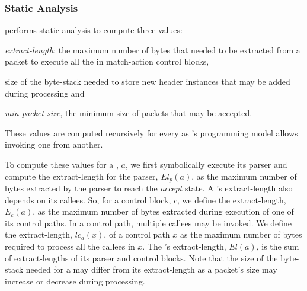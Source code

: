 \documentclass[letterpaper,twocolumn,10pt]{article}
\begin{document}
\subsubsection{Static Analysis}
\label{subsubsection:static-analysis}
\ucomp performs static analysis to compute three values:
\begin{enumerate*}[label=(\roman*)]
  \item \emph{extract-length}: the maximum number of bytes that needed
    to be extracted from a packet to execute all the \uprograms in
    match-action control blocks,
  \item size of the byte-stack needed to store new header instances
    that may be added during processing and
  \item \emph{min-packet-size}, the minimum size of packets that may
    be accepted.
\end{enumerate*}
These values are computed recursively for every \uprogram as
\uswitch's programming model allows invoking one \uprogram from
another.

To compute these values for a \uprogram, $a$, we first symbolically
execute its parser and compute the extract-length for the parser,
$El_{p}(a)$, as the maximum number of bytes extracted by the parser to
reach the \textit{accept} state. A \uprogram's extract-length also
depends on its callees. So, for a control block, $c$, we define the
extract-length, $E_{c}(a)$, as the maximum number of bytes extracted
during execution of one of its control paths. In a control path,
multiple callees may be invoked. We define the extract-length,
$lc_{a}(x)$, of a control path $x$ as the maximum number of bytes
required to process all the callees in $x$. The \uprogram's
extract-length, $El(a)$, is the sum of extract-lengths of its parser
and control blocks. Note that the size of the byte-stack needed for a
\uprogram may differ from its extract-length as a packet's size may
increase or decrease during processing.

\end{document}
